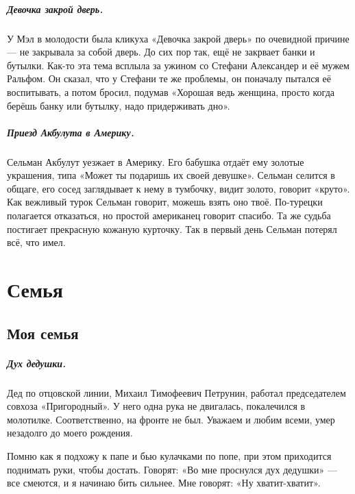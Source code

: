 \documentclass{book}
\begin{document}
\paragraph{Девочка закрой дверь.}
У Мэл в молодости была кликуха «Девочка закрой дверь» по очевидной причине --- не закрывала за собой дверь.
До сих пор так, ещё не закрвает банки и бутылки.
Как-то эта тема всплыла за ужином со Стефани Александер и её мужем Ральфом.
Он сказал, что у Стефани те же проблемы, он поначалу пытался её воспитывать, а потом бросил, подумав «Хорошая ведь женщина, просто когда берёшь банку или бутылку, надо придерживать дно».

\paragraph{Приезд Акбулута в Америку.}
Сельман Акбулут уезжает в Америку.
Его бабушка отдаёт ему золотые украшения, типа «Может ты подаришь их своей девушке».
Сельман селится в общаге, его сосед заглядывает к нему в тумбочку, видит золото, говорит «круто».
Как вежливый турок Сельман говорит, можешь взять оно твоё.
По-турецки полагается отказаться, но простой американец говорит спасибо.
Та же судьба постигает прекрасную кожаную курточку.
Так в первый день Сельман потерял всё, что имел.



\chapter*{Семья}

\section*{Моя семья}

\paragraph{Дух дедушки.}
Дед по отцовской линии, Михаил Тимофеевич Петрунин, работал председателем совхоза «Пригородный».
У него одна рука не двигалась, покалечился в молотилке.
Соответственно, на фронте не был. 
Уважаем и любим всеми, умер незадолго до моего рождения.

Помню как я подхожу к папе и бью кулачками по попе,
при этом приходится поднимать руки, чтобы достать.
Говорят: «Во мне проснулся дух дедушки» --- все смеются, и я начинаю бить сильнее.
Мне говорят: «Ну хватит-хватит».
\end{document}
